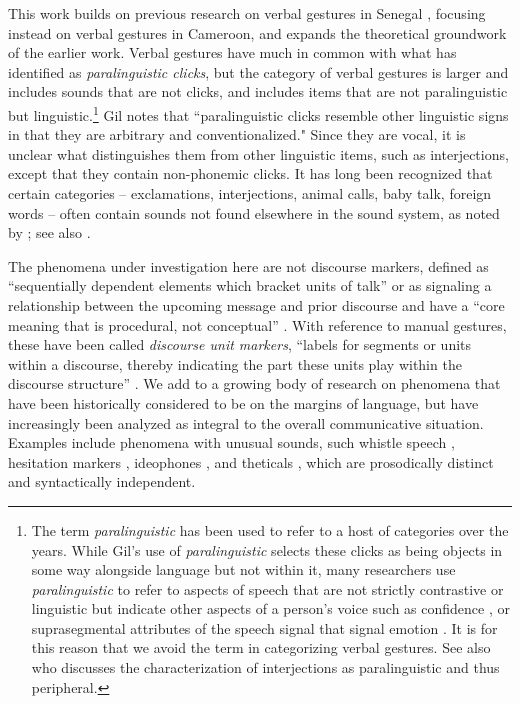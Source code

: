 \documentclass[output=paper
,newtxmath
,modfonts
,nonflat]{langsci/langscibook}
\begin{document}
This work builds on previous research on verbal gestures in Senegal \citet{grenobleetal2015}, focusing instead on verbal gestures in Cameroon, and expands the theoretical groundwork of the earlier work. Verbal gestures have much in common with what \citep{wals-142} has identified as \textit{paralinguistic clicks}, but the category of verbal gestures is larger and includes sounds that are not clicks, and includes items that are not paralinguistic but linguistic.\footnote{The term \textit{paralinguistic} has been used to refer to a host of categories over the years. While Gil’s use of \textit{paralinguistic} selects these clicks as being objects in some way alongside language but not within it, many researchers use \textit{paralinguistic} to refer to aspects of speech that are not strictly contrastive or linguistic but indicate other aspects of a person’s voice such as confidence \citep{Scherer197331}, or suprasegmental attributes of the speech signal that signal emotion \citep{Fujisaki1993}. It is for this reason that we avoid the term in categorizing verbal gestures.  See also \citet[112]{ameka1992} who discusses the characterization of interjections as paralinguistic and thus peripheral.} Gil notes that ``paralinguistic clicks resemble other linguistic signs in that they are arbitrary and conventionalized." Since they are vocal, it is unclear what distinguishes them from other linguistic items, such as interjections, except that they contain non-phonemic clicks. It has long been recognized that certain categories -- exclamations, interjections, animal calls, baby talk, foreign words -- often contain sounds not found elsewhere in the sound system, as noted by \citep[71]{harris1951}; see also \citep{friespike}.

The phenomena under investigation here are not discourse markers, defined as
 ``sequentially dependent elements which bracket units of talk'' \citep[31]{schiffrin1987}  or as signaling  a relationship between the upcoming message and prior discourse \citep{fraser1990, fraser1996, fraser1999} and have a ``core meaning that is procedural, not conceptual'' \citep[950]{fraser1999}. With reference to manual gestures, these have been called \textit{discourse unit markers}, ``labels for segments or units within a discourse, thereby indicating the part these units play within the discourse structure'' \citep[248]{kendon1995}. We add to a growing body of research on phenomena that have been historically considered to be on the margins of language, but have increasingly been analyzed as integral to the overall communicative situation. Examples include phenomena with unusual sounds, such whistle speech \citep{meyer2015, sicoli2016}, hesitation markers \citep{dingemanse2013plos, schegloff1982}, ideophones \citep{childs1994}, and theticals \citep{kaltenbocketal2011}, which are prosodically distinct and syntactically independent.
 
\end{document}
